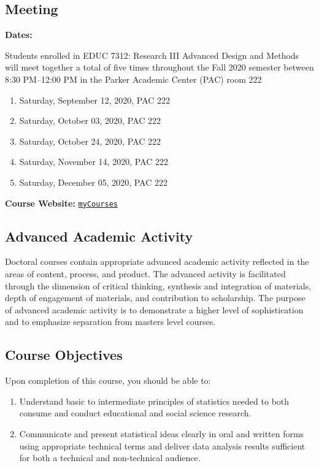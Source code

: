 \documentclass[
]{article}
\providecommand{\tightlist}{%
  \setlength{\itemsep}{0pt}\setlength{\parskip}{0pt}}
\begin{document}
\subsection{Meeting}

\textbf{Dates:}

Students enrolled in EDUC 7312: Research III Advanced Design and Methods
will meet together a total of five times throughout the Fall 2020
semester between 8:30 PM--12:00 PM in the Parker Academic Center (PAC)
room 222

\begin{enumerate}
\def\labelenumi{\arabic{enumi}.}
\tightlist
\item
  Saturday, September 12, 2020, PAC 222
\item
  Saturday, October 03, 2020, PAC 222
\item
  Saturday, October 24, 2020, PAC 222
\item
  Saturday, November 14, 2020, PAC 222
\item
  Saturday, December 05, 2020, PAC 222
\end{enumerate}

\textbf{Course Website:}
\texttt{\href{https://mycourses.umhb.edu/courses/23599}{myCourses}}

\newpage
\subsection{Advanced Academic Activity}

Doctoral courses contain appropriate advanced academic activity
reflected in the areas of content, process, and product. The advanced
activity is facilitated through the dimension of critical thinking,
synthesis and integration of materials, depth of engagement of
materials, and contribution to scholarship. The purpose of advanced
academic activity is to demonstrate a higher level of sophistication and
to emphasize separation from masters level courses.

\subsection{Course Objectives}

Upon completion of this course, you should be able to:

\begin{enumerate}
\def\labelenumi{\arabic{enumi}.}
\tightlist
\item
  Understand basic to intermediate principles of statistics needed to
  both consume and conduct educational and social science research.
\item
  Communicate and present statistical ideas clearly in oral and written
  forms using appropriate technical terms and deliver data analysis
  results sufficient for both a technical and non-technical audience.
\end{enumerate}
\end{document}
